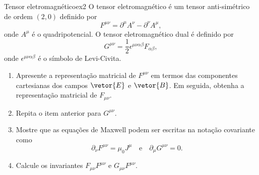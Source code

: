 \begin{exercício}{Tensor eletromagnético}{ex2}
   O tensor eletromagnético é um tensor anti-simétrico de ordem \((2,0)\) definido por
   \begin{equation*}
      F^{\mu \nu} = \partial^\mu A^\nu - \partial^\nu A^\mu,
   \end{equation*}
   onde \(A^\mu\) é o quadripotencial. O tensor eletromagnético dual é definido por
   \begin{equation*}
      G^{\mu\nu} = \frac12 \epsilon^{\mu \nu \alpha \beta} F_{\alpha \beta},
   \end{equation*}
   onde \(\epsilon^{\mu\nu \alpha \beta}\) é o símbolo de Levi-Civita.
   \begin{enumerate}[label=(\alph*)]
      \item Apresente a representação matricial de \(F^{\mu\nu}\) em termos das componentes cartesianas dos campos \(\vetor{E}\) e \(\vetor{B}\). Em seguida, obtenha a representação matricial de \(F_{\mu\nu}.\)
      \item Repita o item anterior para \(G^{\mu\nu}.\)
      \item Mostre que as equações de Maxwell podem ser escritas na notação covariante como
         \begin{equation*}
            \partial_\nu F^{\mu\nu} = \mu_0 J^\mu
            \quad\text{e}\quad
            \partial_\mu G^{\mu\nu} = 0.
         \end{equation*}
      \item Calcule os invariantes \(F_{\mu\nu} F^{\mu\nu}\) e \(G_{\mu\nu} F^{\mu\nu}.\)
   \end{enumerate}
\end{exercício}
